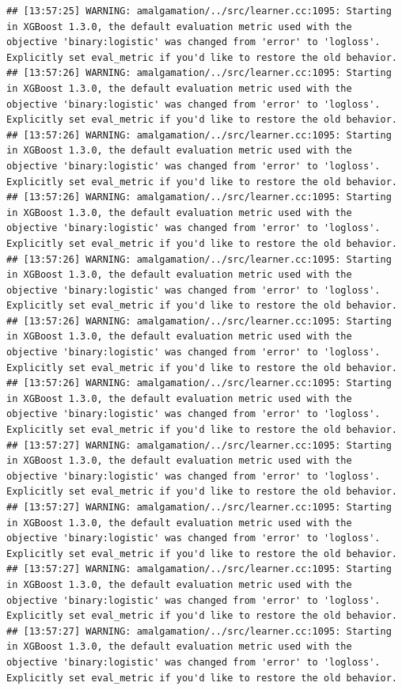 \documentclass[
]{scrbook}
\begin{document}
\begin{verbatim}
## [13:57:25] WARNING: amalgamation/../src/learner.cc:1095: Starting in XGBoost 1.3.0, the default evaluation metric used with the objective 'binary:logistic' was changed from 'error' to 'logloss'. Explicitly set eval_metric if you'd like to restore the old behavior.
## [13:57:26] WARNING: amalgamation/../src/learner.cc:1095: Starting in XGBoost 1.3.0, the default evaluation metric used with the objective 'binary:logistic' was changed from 'error' to 'logloss'. Explicitly set eval_metric if you'd like to restore the old behavior.
## [13:57:26] WARNING: amalgamation/../src/learner.cc:1095: Starting in XGBoost 1.3.0, the default evaluation metric used with the objective 'binary:logistic' was changed from 'error' to 'logloss'. Explicitly set eval_metric if you'd like to restore the old behavior.
## [13:57:26] WARNING: amalgamation/../src/learner.cc:1095: Starting in XGBoost 1.3.0, the default evaluation metric used with the objective 'binary:logistic' was changed from 'error' to 'logloss'. Explicitly set eval_metric if you'd like to restore the old behavior.
## [13:57:26] WARNING: amalgamation/../src/learner.cc:1095: Starting in XGBoost 1.3.0, the default evaluation metric used with the objective 'binary:logistic' was changed from 'error' to 'logloss'. Explicitly set eval_metric if you'd like to restore the old behavior.
## [13:57:26] WARNING: amalgamation/../src/learner.cc:1095: Starting in XGBoost 1.3.0, the default evaluation metric used with the objective 'binary:logistic' was changed from 'error' to 'logloss'. Explicitly set eval_metric if you'd like to restore the old behavior.
## [13:57:26] WARNING: amalgamation/../src/learner.cc:1095: Starting in XGBoost 1.3.0, the default evaluation metric used with the objective 'binary:logistic' was changed from 'error' to 'logloss'. Explicitly set eval_metric if you'd like to restore the old behavior.
## [13:57:27] WARNING: amalgamation/../src/learner.cc:1095: Starting in XGBoost 1.3.0, the default evaluation metric used with the objective 'binary:logistic' was changed from 'error' to 'logloss'. Explicitly set eval_metric if you'd like to restore the old behavior.
## [13:57:27] WARNING: amalgamation/../src/learner.cc:1095: Starting in XGBoost 1.3.0, the default evaluation metric used with the objective 'binary:logistic' was changed from 'error' to 'logloss'. Explicitly set eval_metric if you'd like to restore the old behavior.
## [13:57:27] WARNING: amalgamation/../src/learner.cc:1095: Starting in XGBoost 1.3.0, the default evaluation metric used with the objective 'binary:logistic' was changed from 'error' to 'logloss'. Explicitly set eval_metric if you'd like to restore the old behavior.
## [13:57:27] WARNING: amalgamation/../src/learner.cc:1095: Starting in XGBoost 1.3.0, the default evaluation metric used with the objective 'binary:logistic' was changed from 'error' to 'logloss'. Explicitly set eval_metric if you'd like to restore the old behavior.
\end{verbatim}
\end{document}
